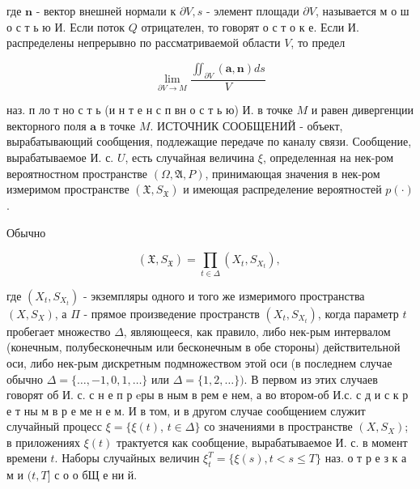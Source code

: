 \documentclass[10pt]{article}
\begin{document}
где $\boldsymbol{n}$ - вектор внешней нормали к $\partial V, s$ - элемент площади $\partial V$, называется м о ш о с т ь ю И. Если поток $Q$ отрицателен, то говорят о с т о к е. Если И. распределены непрерывно по рассматриваемой области $V$, то предел



\[

\lim _{\partial V \rightarrow M} \frac{\iint_{\partial V}(\boldsymbol{a}, \boldsymbol{n}) d s}{V}

\]



наз. п ло т но с т ь (и н т е н с п вн о с т ь ю) И. в точке $M$ и равен дивергенции векторного поля $\boldsymbol{a}$ в точке $M$. ИСТОЧНИК СООБЩЕНИЙ - объект, вырабатывающий сообщения, подлежащие передаче по каналу связи. Сообщение, вырабатываемое И. с. $U$, есть случайная величина $\xi$, определенная на нек-ром вероятностном пространстве $(\Omega, \mathfrak{A}, P)$, принимающая значения в нек-ром измеримом пространстве $\left(\mathfrak{X}, S_{\mathfrak{X}}\right)$ и имеющая распределение вероятностей $p(\cdot)$.



Обычно



\[

\left(\mathfrak{X}, S_{\mathfrak{X}}\right)=\prod_{t \in \Delta}\left(X_{t}, S_{X_{t}}\right) \text {, }

\]



где $\left(X_{t}, S_{X_{t}}\right)$ - экземпляры одного и того же измеримого пространства $\left(X, S_{X}\right)$, а $\Pi$ - прямое произведение пространств $\left(X_{t}, S_{X_{t}}\right)$, когда параметр $t$ пробегает множество $\Delta$, являющееся, как правило, либо нек-рым интервалом (конечным, полубесконечным или бесконечным в обе стороны) действительной оси, либо нек-рым дискретным подмножеством этой оси (в последнем случае обычно $\Delta=\{\ldots,-1,0,1, \ldots\}$ или $\Delta=\{1,2, \ldots\})$. В первом из этих случаев говорят об И. с. с н е п р eры в ным в рем е нем, а во втором-об И.с. с д и с к р е т ны м в р е ме н е м. И в том, и в другом случае сообщением служит случайный процесс $\xi=\{\xi(t)$, $t \in \Delta\}$ со значениями в пространстве $\left(X, S_{X}\right)$; в приложениях $\xi(t)$ трактуется как сообщение, вырабатываемое И. с. в момент времени $t$. Наборы случайных величин $\xi_{t}^{T}=\{\xi(s), t<s \leqslant T\}$ наз. о т р е з к а м и $(t, T]$ с о о бЩ е ни й.
\end{document}
